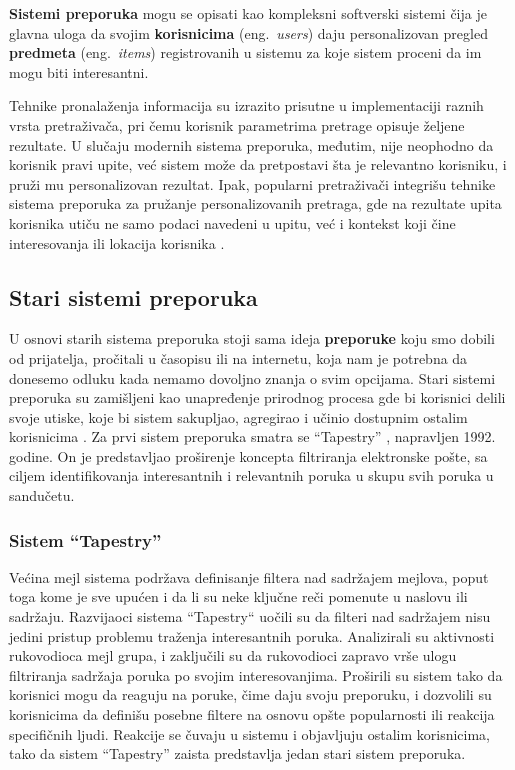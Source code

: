 \documentclass[a4paper]{article}
\begin{document}
\textbf{Sistemi preporuka} mogu se opisati kao kompleksni softverski sistemi čija je glavna uloga da svojim \textbf{korisnicima} (eng.~{\em users}) daju personalizovan pregled \textbf{predmeta} (eng.~{\em items}) registrovanih u sistemu za koje sistem proceni da im mogu biti interesantni.

Tehnike pronalaženja informacija su izrazito prisutne u implementaciji raznih vrsta pretraživača, pri čemu korisnik parametrima pretrage opisuje željene rezultate. U slučaju modernih sistema preporuka, međutim, nije neophodno da korisnik pravi upite, već sistem može da pretpostavi šta je relevantno korisniku, i pruži mu personalizovan rezultat. Ipak, popularni pretraživači integrišu tehnike sistema preporuka za pružanje personalizovanih pretraga, gde na rezultate upita korisnika utiču ne samo podaci navedeni u upitu, već i kontekst koji čine interesovanja ili lokacija korisnika \cite{aggarwal_recommender_2016}.

\subsection{Stari sistemi preporuka}
\label{subsec:stari_sistemi_preporuka}

U osnovi starih sistema preporuka stoji sama ideja \textbf{preporuke} koju smo dobili od prijatelja, pročitali u časopisu ili na internetu, koja nam je potrebna da donesemo odluku kada nemamo dovoljno znanja o svim opcijama. Stari sistemi preporuka su zamišljeni kao unapređenje prirodnog procesa gde bi korisnici delili svoje utiske, koje bi sistem sakupljao, agregirao i učinio dostupnim ostalim korisnicima \cite{resnick_recommender_1997}. Za prvi sistem preporuka smatra se ``Tapestry'' \cite{goldberg_using_1992}, napravljen 1992. godine. On je predstavljao proširenje koncepta filtriranja elektronske pošte, sa ciljem identifikovanja interesantnih i relevantnih poruka u skupu svih poruka u sandučetu.

\subsubsection{Sistem ``Tapestry''}
\label{subsubsec:tapestry}

Većina mejl sistema podržava definisanje filtera nad sadržajem mejlova, poput toga kome je sve upućen i da li su neke ključne reči pomenute u naslovu ili sadržaju. Razvijaoci sistema ``Tapestry`` uočili su da filteri nad sadržajem nisu jedini pristup problemu traženja interesantnih poruka. Analizirali su aktivnosti rukovodioca mejl grupa, i zaključili su da rukovodioci zapravo vrše ulogu filtriranja sadržaja poruka po svojim interesovanjima. Proširili su sistem tako da korisnici mogu da reaguju na poruke, čime daju svoju preporuku, i dozvolili su korisnicima da definišu posebne filtere na osnovu opšte popularnosti ili reakcija specifičnih ljudi. Reakcije se čuvaju u sistemu i objavljuju ostalim korisnicima, tako da sistem ``Tapestry'' zaista predstavlja jedan stari sistem preporuka.
\end{document}
